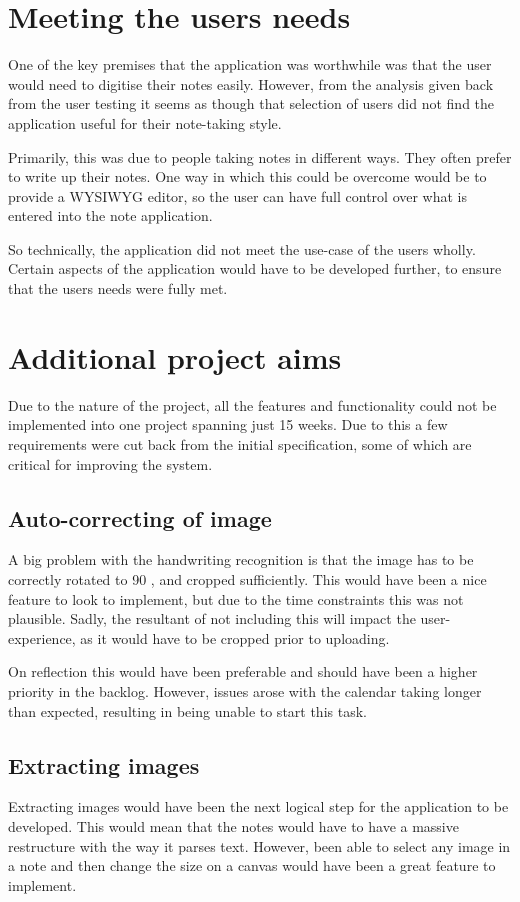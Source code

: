 \section{Meeting the users needs}
One of the key premises that the application was worthwhile was that the user would need to digitise their notes easily. However, from the analysis given back from the user testing it seems as though that selection of users did not find the application useful for their note-taking style.

Primarily, this was due to people taking notes in different ways. They often prefer to write up their notes. One way in which this could be overcome would be to provide a WYSIWYG editor, so the user can have full control over what is entered into the note application.

So technically, the application did not meet the use-case of the users wholly. Certain aspects of the application would have to be developed further, to ensure that the users needs were fully met.

\section{Additional project aims}
Due to the nature of the project, all the features and functionality could not be implemented into one project spanning just 15 weeks. Due to this a few requirements were cut back from the initial specification, some of which are critical for improving the system.

\subsection{Auto-correcting of image}
A big problem with the handwriting recognition is that the image has to be correctly rotated to 90 \textdegree, and cropped sufficiently. This would have been a nice feature to look to implement, but due to the time constraints this was not plausible. Sadly, the resultant of not including this will impact the user-experience, as it would have to be cropped prior to uploading.

On reflection this would have been preferable and should have been a higher priority in the backlog. However, issues arose with the calendar taking longer than expected, resulting in being unable to start this task.

\subsection{Extracting images}
Extracting images would have been the next logical step for the application to be developed. This would mean that the notes would have to have a massive restructure with the way it parses text. However, been able to select any image in a note and then change the size on a canvas would have been a great feature to implement.

